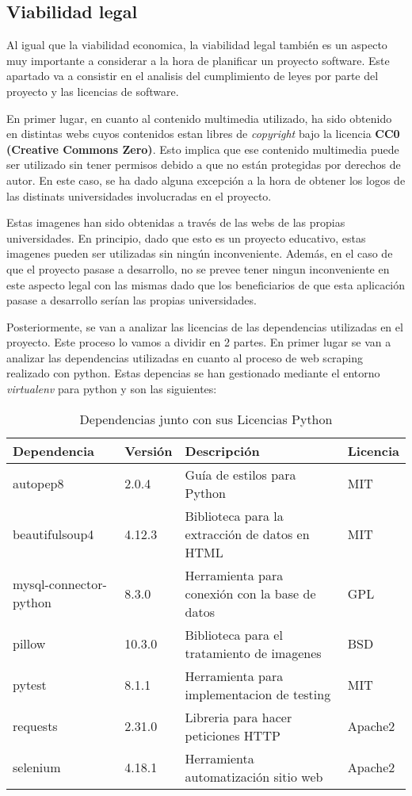 \subsection{Viabilidad legal}
Al igual que la viabilidad economica, la viabilidad legal también es un aspecto muy importante a considerar a la hora de planificar un proyecto software. Este apartado va a consistir en el analisis del cumplimiento de leyes por parte del proyecto y las licencias de software. 

En primer lugar, en cuanto al contenido multimedia utilizado, ha sido obtenido en distintas webs cuyos contenidos estan libres de \textit{copyright} bajo la licencia \textbf{CC0 (Creative Commons Zero)}. Esto implica que ese contenido multimedia puede ser utilizado sin tener permisos debido a que no están protegidas por derechos de autor. En este caso, se ha dado alguna excepción a la hora de obtener los logos de las distinats universidades involucradas en el proyecto.

Estas imagenes han sido obtenidas a través de las webs de las propias universidades. En principio, dado que esto es un proyecto educativo, estas imagenes pueden ser utilizadas sin ningún inconveniente. Además, en el caso de que el proyecto pasase a desarrollo, no se prevee tener ningun inconveniente en este aspecto legal con las mismas dado que los beneficiarios de que esta aplicación pasase a desarrollo serían las propias universidades.

Posteriormente, se van a analizar las licencias de las dependencias utilizadas en el proyecto. Este proceso lo vamos a dividir en 2 partes. En primer lugar se van a analizar las dependencias utilizadas en cuanto al proceso de web scraping realizado con python. Estas depencias se han gestionado mediante el entorno \textit{virtualenv} para python y son las siguientes:

\begin{table}[H]
    \centering
    \renewcommand{\arraystretch}{1.2} %
    \begin{tabularx}{\textwidth}{l l X l}
        \hline
        \textbf{Dependencia} & \textbf{Versión} & \textbf{Descripción} & \textbf{Licencia} \\
        \hline
        autopep8 & 2.0.4 & Guía de estilos para Python & MIT \\
        beautifulsoup4 & 4.12.3 & Biblioteca para la extracción de datos en HTML & MIT \\
        mysql-connector-python & 8.3.0 & Herramienta para conexión con la base de datos & GPL \\
        pillow & 10.3.0 & Biblioteca para el tratamiento de imagenes & BSD \\
        pytest & 8.1.1 & Herramienta para implementacion de testing & MIT \\
        requests & 2.31.0 & Libreria para hacer peticiones HTTP & Apache2 \\
        selenium & 4.18.1 & Herramienta automatización sitio web & Apache2 \\
        \hline
    \end{tabularx}
    \caption{Dependencias junto con sus Licencias Python}
    \label{tab:licencias1}
\end{table}

